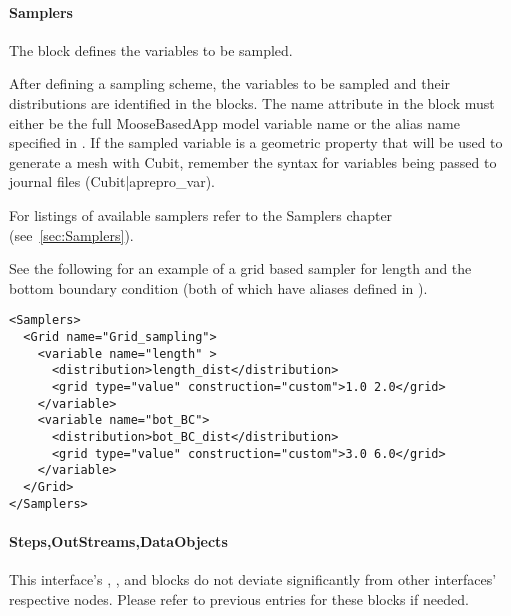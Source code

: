 \paragraph{Samplers}
The  block defines the variables to be sampled.

After defining a sampling scheme, the variables to be sampled and
their distributions are identified in the  blocks.
The name attribute in the  block must either be the
full MooseBasedApp model variable name or the alias name specified in
.  If the sampled variable is a geometric property
that will be used to generate a mesh with Cubit, remember the syntax for
variables being passed to journal files (Cubit|aprepro\_var).

For listings of available samplers
refer to the Samplers chapter (see~\ref{sec:Samplers}).

See the following for an example of a grid based sampler for
length and the bottom boundary condition (both of which have aliases
defined in ).

\begin{lstlisting}[style=XML]
<Samplers>
  <Grid name="Grid_sampling">
    <variable name="length" >
      <distribution>length_dist</distribution>
      <grid type="value" construction="custom">1.0 2.0</grid>
    </variable>
    <variable name="bot_BC">
      <distribution>bot_BC_dist</distribution>
      <grid type="value" construction="custom">3.0 6.0</grid>
    </variable>
  </Grid>
</Samplers>
\end{lstlisting}

\paragraph{Steps,OutStreams,DataObjects}
This interface's , , and
 blocks do not deviate significantly from
other interfaces' respective nodes.  Please refer to previous
entries for these blocks if needed.


